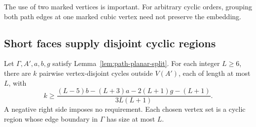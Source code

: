 The use of two marked vertices is important.
For arbitrary cyclic orders, grouping both path edges at one marked cubic vertex need not preserve the embedding.

\subsection{Short faces supply disjoint cyclic regions}

\begin{lemma}\label{lem:path-face-packing}
Let $\Gamma,A',a,b,g$ satisfy Lemma~\ref{lem:path-planar-split}.
For each integer $L\ge6$, there are $k$ pairwise vertex-disjoint cycles outside $V(A')$, each of length at most $L$, with
\begin{equation}\label{eq:path-packing}
 k\ge
 \frac{(L-5)b-(L+3)a-2(L+1)g-(L+1)}{3L(L+1)}.
\end{equation}
A negative right side imposes no requirement.
Each chosen vertex set is a cyclic region whose edge boundary in $\Gamma$ has size at most $L$.
\end{lemma}

